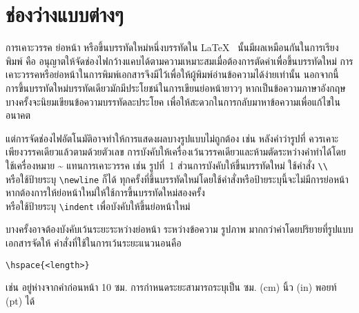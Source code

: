 \section{ช่องว่างแบบต่างๆ}
การเคาะวรรค ย่อหน้า หรือขึ้นบรรทัดใหม่หนึ่งบรรทัดใน \LaTeX~ นั้นมีผลเหมือนกันในการเรียงพิมพ์ คือ อนุญาตให้จัดช่องไฟกว้างแคบได้ตามความเหมาะสมเมื่อต้องการตัดคำเพื่อขึ้นบรรทัดใหม่
การเคาะวรรคหรือย่อหน้าในการพิมพ์เอกสารจึงมีไว้เพื่อให้ผู้พิมพ์อ่านข้อความได้ง่ายเท่านั้น
นอกจากนี้ การขึ้นบรรทัดใหม่บรรทัดเดียวมักมีประโยชน์ในการเขียนย่อหน้ายาวๆ
หากเป็นข้อความภาษาอังกฤษ บางครั้งจะนิยมเขียนข้อความบรรทัดละประโยค เพื่อให้สะดวกในการกลับมาหาข้อความเพื่อแก้ไขในอนาคต

แต่การจัดช่องไฟอัตโนมัติอาจทำให้การแสดงผลบางรูปแบบไม่ถูกต้อง เช่น หลังคำว่ารูปที่ ควรเคาะเพียงวรรคเดียวแล้วตามด้วยตัวเลข การบังคับให้เครื่องเว้นวรรคเดียวและห้ามตัดระหว่างคำทำได้โดยใช้เครื่องหมาย {\textasciitilde} แทนการเคาะวรรค เช่น รูปที่~1 ส่วนการบังคับให้ขึ้นบรรทัดใหม่ ใช้คำสั่ง \lstinline+\\+ \\
หรือใช้ป้ายระบุ \lstinline|\newline| \newline
ก็ได้ ทุกครั้งที่ขึ้นบรรทัดใหม่โดยใช้คำสั่งหรือป้ายระบุนี้จะไม่มีการย่อหน้า
หากต้องการให้ย่อหน้าใหม่ให้ใช้การขึ้นบรรทัดใหม่สองครั้ง \\
\indent หรือใช้ป้ายระบุ \lstinline|\indent| เพื่อบังคับให้ขึ้นย่อหน้าใหม่

\begin{comment}
	ระยะระหว่างบรรทัดจะกำหนดไว้ในคลาส แต่หากต้องการระบุเอง มีชุดคำสั่งในแพ็คเกจ setspace
	ได้แก่ \lstinline|\singlespacing|, \lstinline|\onehalfspacing|, \lstinline|\doublespacing|
	สำหรับระยะระหว่างบรรทัดหนึ่งเท่า หนึ่งเท่าครึ่ง และสองเท่า ตามลำดับ
	หากต้องการกำหนดเอง ใช้ป้ายระบุ \lstinline|\setstretch{<factor>}| แล้วกำหนด factor เป็นตัวเลขที่ต้องการ
	ในกรณีที่ไม่ต้องการใช้แพ็คเกจ อาจใช้ป้ายระบุ \lstinline|\linespread{<factor>}| ก็ได้ ซึ่งมีผลเหมือน \lstinline|\setstretch{<factor>}|
\end{comment}

บางครั้งอาจต้องบังคับเว้นระยะระหว่างย่อหน้า ระหว่างข้อความ รูปภาพ มากกว่าค่าโดยปริยายที่รูปแบบเอกสารจัดให้ คำสั่งที่ใช้ในการเว้นระยะแนวนอนคือ
\begin{lstlisting}[numbers=none]
	\hspace{<length>}
\end{lstlisting}
เช่น \hspace{10cm} อยู่ห่างจากคำก่อนหน้า 10 ซม. การกำหนดระยะสามารถระบุเป็น ซม. (cm) นิ้ว (in) พอยท์ (pt) ได้

